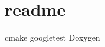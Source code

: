 \chapter{readme}
\hypertarget{md__2_users_2davidblair_2_desktop_2_c_make_class_ex_2readme}{}\label{md__2_users_2davidblair_2_desktop_2_c_make_class_ex_2readme}
cmake googletest Doxygen 